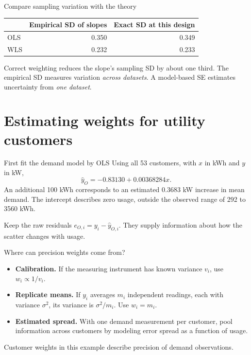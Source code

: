 \begin{frame}{Compare sampling variation with the theory}
    \begin{center}
        \begin{tabular}{lrr}
            \toprule & Empirical SD of slopes & Exact SD at this design \\ \midrule
            OLS & 0.350 & 0.349 \\
            WLS & 0.232 & 0.233 \\ \bottomrule
        \end{tabular}
    \end{center}
    Correct weighting reduces the slope's sampling SD by about one third. The empirical SD measures variation \emph{across datasets}. A model-based SE estimates uncertainty from \emph{one dataset}.
\end{frame}
\section{Estimating weights for utility customers}

\begin{frame}{First fit the demand model by OLS}
    Using all 53 customers, with $x$ in kWh and $y$ in kW,
    \[
        \hat y_O=-0.83130+0.00368284x.
    \]
    An additional 100 kWh corresponds to an estimated 0.3683 kW increase in mean demand. The intercept describes zero usage, outside the observed range of 292 to 3560 kWh.
    \svspace{0.5em}

    Keep the raw residuals $e_{O,i}=y_i-\hat y_{O,i}$. They supply information about how the scatter changes with usage.
\end{frame}

\begin{frame}{Where can precision weights come from?}
    \begin{itemize}
        \item \textbf{Calibration.} If the measuring instrument has known variance $v_i$, use $w_i\propto 1/v_i$.
        \item \textbf{Replicate means.} If $y_i$ averages $m_i$ independent readings, each with variance $\sigma^2$, its variance is $\sigma^2/m_i$. Use $w_i=m_i$.
        \item \textbf{Estimated spread.} With one demand measurement per customer, pool information across customers by modeling error spread as a function of usage.
    \end{itemize}
    Customer weights in this example describe precision of demand observations.
\end{frame}

